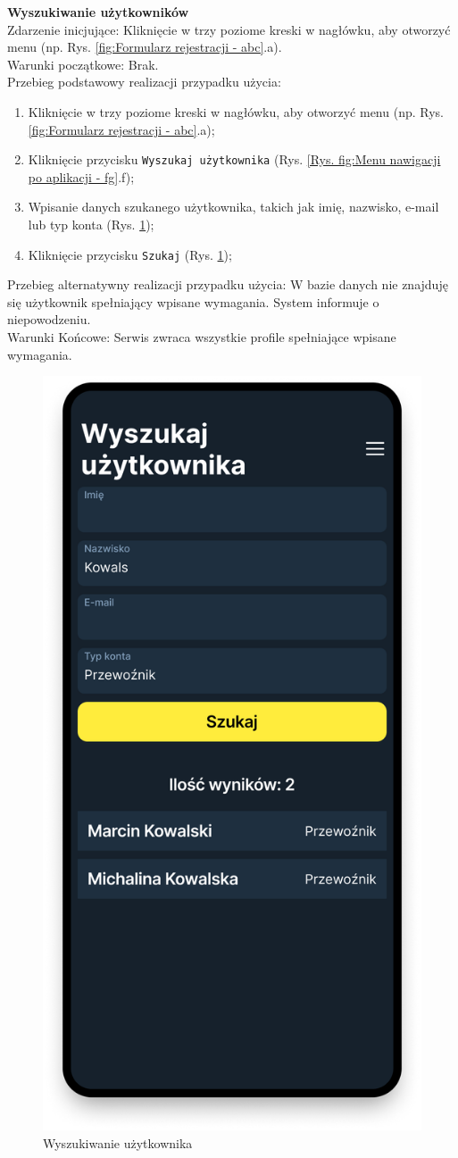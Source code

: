 \textbf{Wyszukiwanie użytkowników} \\
Zdarzenie inicjujące: Kliknięcie w trzy poziome kreski w nagłówku, aby otworzyć menu (np. Rys. \ref{fig:Formularz rejestracji - abc}.a). \\
Warunki początkowe: Brak. \\
Przebieg podstawowy realizacji przypadku użycia:
\begin{enumerate}
    \item Kliknięcie w trzy poziome kreski w nagłówku, aby otworzyć menu (np. Rys. \ref{fig:Formularz rejestracji - abc}.a);
    \item Kliknięcie przycisku \texttt{Wyszukaj użytkownika} (Rys. \ref{Rys. fig:Menu nawigacji po aplikacji - fg}.f);
    \item Wpisanie danych szukanego użytkownika, takich jak imię, nazwisko, e-mail lub typ konta (Rys. \ref{Rys. fig:Wyszukiwanie użytkownika});
    \item Kliknięcie przycisku \texttt{Szukaj} (Rys. \ref{Rys. fig:Wyszukiwanie użytkownika});
\end{enumerate}
Przebieg alternatywny realizacji przypadku użycia: W bazie danych nie znajduję się użytkownik spełniający wpisane wymagania. System informuje o niepowodzeniu. \\
Warunki Końcowe: Serwis zwraca wszystkie profile spełniające wpisane wymagania.\\
\begin{figure}[H]
	\centering
		\includegraphics[width=0.3\linewidth]{rozdzial1/szukaj_uzytkownika.png}
	\caption{Wyszukiwanie użytkownika}
	\label{Rys. fig:Wyszukiwanie użytkownika}
\end{figure}
\label{Przeglądanie zleceń}

